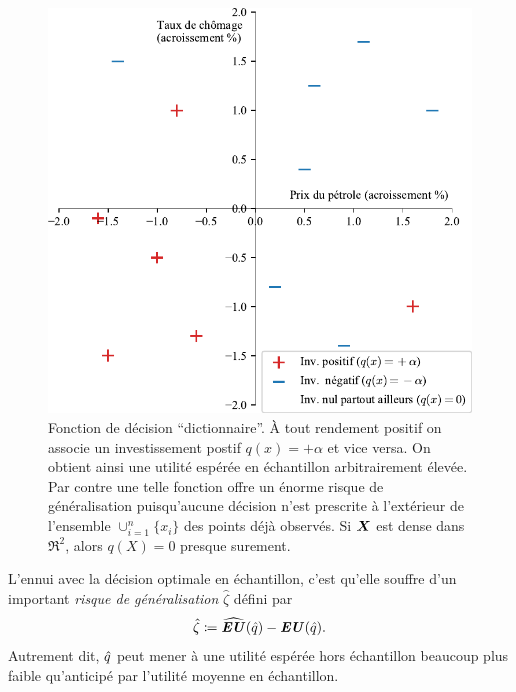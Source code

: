 \begin{figure}
  \centering
  \includegraphics[width=\textwidth]{../experiments/fig/pres/pres2_fr.pdf}
  \caption[Décision ``dictionnaire'']{Fonction de décision ``dictionnaire''. À tout
    rendement positif on associe un investissement postif $q(x)=+\alpha$ et vice versa. On
    obtient ainsi une utilité espérée en échantillon arbitrairement élevée. Par contre une
    telle fonction offre un énorme risque de généralisation puisqu'aucune décision n'est
    prescrite à l'extérieur de l'ensemble $\cup_{i=1}^n\{x_i\}$ des points déjà observés. Si
    $\bm{X}$ est dense dans $\Re^2$, alors $q(X)=0$ presque surement. }
  \label{fig_pres2}
\end{figure}

L'ennui avec la décision optimale en échantillon, c'est qu'elle souffre d'un important
\textit{risque de généralisation} $\hat\zeta$ défini par
\begin{equation}
  \hat\zeta \coloneqq \operatorname{\widehat{\operatorname{\mbox{\textbf{\textit{EU}}}}}}(\hat q) - \operatorname{\mbox{\textbf{\textit{EU}}}}(\hat q).
\end{equation}
Autrement dit, $\hat q$ peut mener à une utilité espérée hors échantillon beaucoup plus
faible qu'anticipé par l'utilité moyenne en échantillon.

